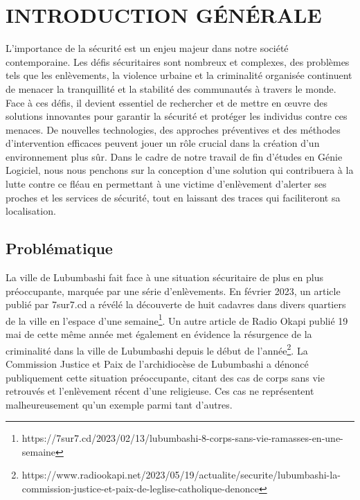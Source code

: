 \chapter*{INTRODUCTION GÉNÉRALE}
\justifying
\large

L'importance de la sécurité est un enjeu majeur dans notre société contemporaine. Les défis sécuritaires sont nombreux et complexes, des problèmes tels que les enlèvements, la violence urbaine et la criminalité organisée continuent de menacer la tranquillité et la stabilité des communautés à travers le monde.\\

Face à ces défis, il devient essentiel de rechercher et de mettre en œuvre des solutions innovantes pour garantir la sécurité et protéger les individus contre ces menaces. De nouvelles technologies, des approches préventives et des méthodes d'intervention efficaces peuvent jouer un rôle crucial dans la création d'un environnement plus sûr.
Dans le cadre de notre travail de fin d’études en Génie Logiciel, nous nous penchons sur la conception d’une solution qui contribuera à la lutte contre ce fléau en permettant à une victime d'enlèvement d'alerter ses proches et les services de sécurité, tout en laissant des traces qui faciliteront sa localisation.

\section{Problématique}

La ville de Lubumbashi fait face à une situation sécuritaire de plus en plus préoccupante, marquée par une série d'enlèvements. En février 2023, un article publié par 7sur7.cd a révélé la découverte de huit cadavres dans divers quartiers de la ville en l'espace d'une semaine\footnote{https://7sur7.cd/2023/02/13/lubumbashi-8-corps-sans-vie-ramasses-en-une-semaine}. Un autre article de Radio Okapi publié 19 mai de cette même année met également en évidence la résurgence de la criminalité dans la ville de Lubumbashi depuis le début de l'année\footnote{https://www.radiookapi.net/2023/05/19/actualite/securite/lubumbashi-la-commission-justice-et-paix-de-leglise-catholique-denonce }. La Commission Justice et Paix de l'archidiocèse de Lubumbashi a dénoncé publiquement cette situation préoccupante, citant des cas de corps sans vie retrouvés et l'enlèvement récent d'une religieuse.  Ces cas ne représentent malheureusement qu'un exemple parmi tant d'autres.\\

